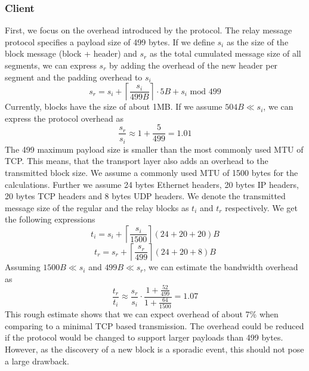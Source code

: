 \subsubsection{Client}
First, we focus on the overhead introduced by the protocol. The relay message protocol specifies a payload size of 499 bytes. If we define $s_i$ as the size of the block message (block + header) and $s_r$ as the total cumulated message size of all segments, we can express $s_r$ by adding the overhead of the new header per segment and the padding overhead to $s_i$
\begin{equation}
	s_r = s_i+ \left\lceil \frac{s_i}{499B} \right\rceil \cdot 5B + s_i \mbox{ mod } 499
\end{equation}
Currently, blocks have the size of about 1MB. If we assume $504B \ll s_i$, we can express the protocol overhead as  
\begin{equation} \label{eq:overhead}
	\frac{s_r}{s_i} \approx 1+\frac{5}{499} = 1.01
\end{equation}
The 499 maximum payload size is smaller than the most commonly used MTU of TCP. This means, that the transport layer also adds an overhead to the transmitted block size. We assume a commonly used MTU of 1500 bytes for the calculations. Further we assume 24 bytes Ethernet headers, 20 bytes IP headers, 20 bytes TCP headers and 8 bytes UDP headers. We denote the transmitted message size of the regular and the relay blocks as $t_i$ and $t_r$ respectively. We get the following expressions
\begin{equation}
	t_i = s_i + \left\lceil \frac{s_i}{1500} \right\rceil(24 + 20 + 20)B
\end{equation} 
\begin{equation}
	t_r = s_r + \left\lceil \frac{s_r}{499} \right\rceil(24 + 20 + 8)B
\end{equation} 
Assuming $1500B \ll s_i$ and $499B \ll s_r$, we can estimate the bandwidth overhead as
\begin{equation} \label{eq:throughput}
	\frac{t_r}{t_i}\approx \frac{s_r}{s_i} \cdot\frac{1+\frac{52}{499}}{1+\frac{64}{1500}} = 1.07
\end{equation}
This rough estimate shows that we can expect overhead of about 7\% when comparing to a minimal TCP based transmission. The overhead could be reduced if the protocol would be changed to support larger payloads than 499 bytes. However, as the discovery of a new block is a sporadic event, this should not pose a large drawback.\\
